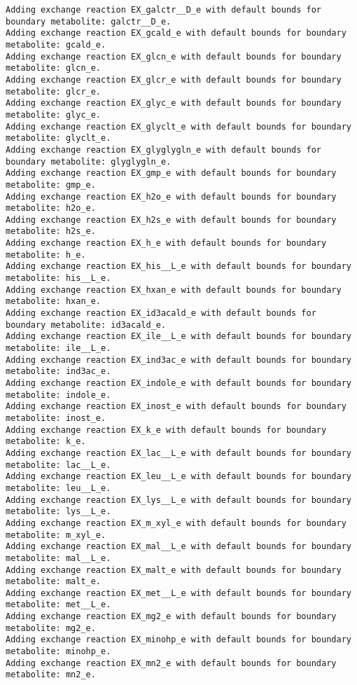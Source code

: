 \documentclass[
  letterpaper,
  DIV=11,
  numbers=noendperiod]{scrartcl}
\begin{document}
\begin{verbatim}
Adding exchange reaction EX_galctr__D_e with default bounds for boundary metabolite: galctr__D_e.
Adding exchange reaction EX_gcald_e with default bounds for boundary metabolite: gcald_e.
Adding exchange reaction EX_glcn_e with default bounds for boundary metabolite: glcn_e.
Adding exchange reaction EX_glcr_e with default bounds for boundary metabolite: glcr_e.
Adding exchange reaction EX_glyc_e with default bounds for boundary metabolite: glyc_e.
Adding exchange reaction EX_glyclt_e with default bounds for boundary metabolite: glyclt_e.
Adding exchange reaction EX_glyglygln_e with default bounds for boundary metabolite: glyglygln_e.
Adding exchange reaction EX_gmp_e with default bounds for boundary metabolite: gmp_e.
Adding exchange reaction EX_h2o_e with default bounds for boundary metabolite: h2o_e.
Adding exchange reaction EX_h2s_e with default bounds for boundary metabolite: h2s_e.
Adding exchange reaction EX_h_e with default bounds for boundary metabolite: h_e.
Adding exchange reaction EX_his__L_e with default bounds for boundary metabolite: his__L_e.
Adding exchange reaction EX_hxan_e with default bounds for boundary metabolite: hxan_e.
Adding exchange reaction EX_id3acald_e with default bounds for boundary metabolite: id3acald_e.
Adding exchange reaction EX_ile__L_e with default bounds for boundary metabolite: ile__L_e.
Adding exchange reaction EX_ind3ac_e with default bounds for boundary metabolite: ind3ac_e.
Adding exchange reaction EX_indole_e with default bounds for boundary metabolite: indole_e.
Adding exchange reaction EX_inost_e with default bounds for boundary metabolite: inost_e.
Adding exchange reaction EX_k_e with default bounds for boundary metabolite: k_e.
Adding exchange reaction EX_lac__L_e with default bounds for boundary metabolite: lac__L_e.
Adding exchange reaction EX_leu__L_e with default bounds for boundary metabolite: leu__L_e.
Adding exchange reaction EX_lys__L_e with default bounds for boundary metabolite: lys__L_e.
Adding exchange reaction EX_m_xyl_e with default bounds for boundary metabolite: m_xyl_e.
Adding exchange reaction EX_mal__L_e with default bounds for boundary metabolite: mal__L_e.
Adding exchange reaction EX_malt_e with default bounds for boundary metabolite: malt_e.
Adding exchange reaction EX_met__L_e with default bounds for boundary metabolite: met__L_e.
Adding exchange reaction EX_mg2_e with default bounds for boundary metabolite: mg2_e.
Adding exchange reaction EX_minohp_e with default bounds for boundary metabolite: minohp_e.
Adding exchange reaction EX_mn2_e with default bounds for boundary metabolite: mn2_e.

\end{verbatim}
\end{document}
